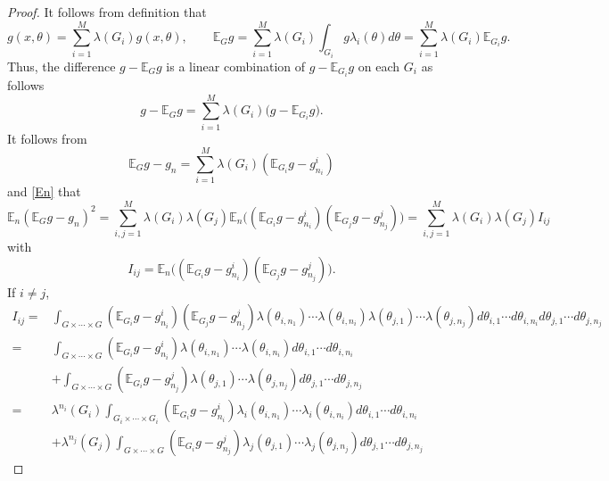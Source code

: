 \begin{proof}%
It follows from definition that
\begin{equation}
g(x, \theta) = \sum_{i=1}^M \lambda(G_i) g(x, \theta),\qquad \mathbb{E}_G g =\sum_{i=1}^M\lambda(G_i) \int_{G_i} g\lambda_i(\theta)d\theta = \sum_{i=1}^M \lambda(G_i) \mathbb{E}_{G_i}g.
\end{equation}
Thus, the difference $g - \mathbb{E}_G g$ is a linear combination of $g -\mathbb{E}_{G_i}g$ on each $G_i$ as follows
\begin{equation}
g - \mathbb{E}_G g = \sum_{i=1}^M \lambda(G_i) \big (g -\mathbb{E}_{G_i}g\big ).
\end{equation}
It follows from 
\begin{equation}
\mathbb{E}_G g-g_n=\sum_{i=1}^M \lambda(G_i) (\mathbb{E}_{G_i}g -  g^i_{ n_i})
\end{equation}
and \eqref{En} that
\begin{equation} 
\mathbb{E}_n(\mathbb{E}_G g -g_n)^2 =\sum_{i,j=1}^M \lambda(G_i) \lambda(G_j) \mathbb{E}_n \big ((\mathbb{E}_{G_i}g -  g^i_{ n_i})(\mathbb{E}_{G_j}g -  g^j_{ n_j})\big )
=\sum_{i,j=1}^M \lambda(G_i) \lambda(G_j) I_{ij}  
\end{equation}
with 
$$
I_{ij} = \mathbb{E}_n \big ((\mathbb{E}_{G_i}g -  g^i_{ n_i})(\mathbb{E}_{G_j}g -  g^j_{ n_j})\big ).
$$
\iffalse
If $i\neq j$,
\begin{equation}\label{eq:Iij}
\begin{split}
I_{ij}=&\int_{G\times \cdots\times G} (\mathbb{E}_{G_i}g -  g^i_{ n_i})(\mathbb{E}_{G_j}g -  g^j_{ n_j})\lambda(\theta_{i,n_1})\cdots\lambda(\theta_{i,n_i})\lambda(\theta_{j,1})\cdots \lambda(\theta_{j,n_j})d\theta_{i,1}\cdots d\theta_{i,n_i}d\theta_{j,1}\cdots d\theta_{j,n_j}
\\
=&\int_{G\times \cdots\times G} (\mathbb{E}_{G_i}g -  g^i_{ n_i})\lambda(\theta_{i,n_1})\cdots\lambda(\theta_{i,n_i})d\theta_{i,1}\cdots d\theta_{i,n_i}
\\
&+
\int_{G\times \cdots\times G} (\mathbb{E}_{G_i}g -  g^j_{ n_j})\lambda(\theta_{j,1})\cdots \lambda(\theta_{j,n_j})d\theta_{j,1}\cdots d\theta_{j,n_j}
\\
=&\lambda^{n_i}(G_i)\int_{G_i\times \cdots\times G_i} (\mathbb{E}_{G_i}g -  g^i_{ n_i})\lambda_i(\theta_{i,n_1})\cdots\lambda_i(\theta_{i,n_i})d\theta_{i,1}\cdots d\theta_{i,n_i}
\\
&+
\lambda^{n_j}(G_j)\int_{G\times \cdots\times G} (\mathbb{E}_{G_i}g -  g^j_{ n_j})\lambda_j(\theta_{j,1})\cdots \lambda_j(\theta_{j,n_j})d\theta_{j,1}\cdots d\theta_{j,n_j}

\end{split}
\end{equation}
\end{proof}
